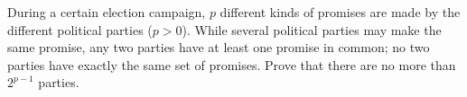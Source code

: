 During a certain election campaign, $p$ different kinds of promises are made by the different political parties ($p>0$). While several political parties may make the same promise, any two parties have at least one promise in common; no two parties have exactly the same set of promises. Prove that there are no more than $2^{p-1}$ parties.